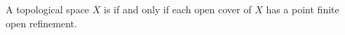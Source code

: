 A topological space $X$ is  if and only if each open cover of $X$ has a point finite open refinement.
